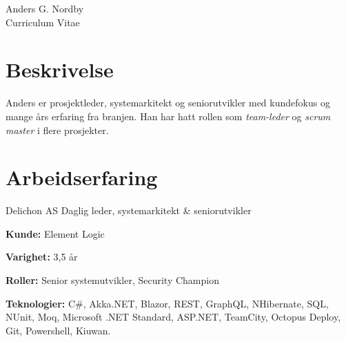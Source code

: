 \documentclass[10pt]{article} %
\begin{document}
\begin{paracol}{2} %


\parbox[top][0.12\textheight][c]{\linewidth}{ %
	\vspace{-0.04\textheight} %
	\centering %
	{\sffamily\Huge Anders G. Nordby}\\\medskip %
	{\Huge\color{headings}\cvtextfont Curriculum Vitae}
}


\section{Beskrivelse}

Anders er prosjektleder, systemarkitekt og seniorutvikler med kundefokus og mange års erfaring fra branjen.
Han har hatt rollen som \textit{team-leder} og \textit{scrum master} i flere prosjekter. 


\section{Arbeidserfaring} 

{}
{Delichon AS} 
{Daglig leder, systemarkitekt \& seniorutvikler} 
{\textbf{}
 
\textbf{Kunde:} Element Logic

\textbf{Varighet:} 3,5 år

\textbf{Roller:} Senior systemutvikler, Security Champion

\textbf{Teknologier:} C\#, Akka.NET, Blazor, REST, GraphQL, NHibernate, SQL, NUnit, Moq, Microsoft .NET Standard, ASP.NET, TeamCity, Octopus Deploy, Git, Powershell, Kiuwan.
 
}
\end{paracol}
\end{document}
